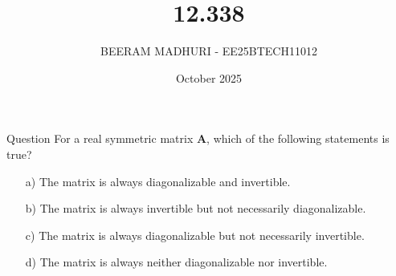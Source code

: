 \documentclass{beamer}
\title %
{12.338}
\date{October  2025}
\author %
{BEERAM MADHURI - EE25BTECH11012}
\begin{document}
\frame{\titlepage}
\begin{frame}{Question}
For a real symmetric matrix $\mathbf{A}$, which of the following statements is true?

\begin{enumerate}
    \item[a)] The matrix is always diagonalizable and invertible.
    \item[b)] The matrix is always invertible but not necessarily diagonalizable.
    \item[c)] The matrix is always diagonalizable but not necessarily invertible.
    \item[d)] The matrix is always neither diagonalizable nor invertible.
\end{enumerate}
\end{frame}
\end{document}
